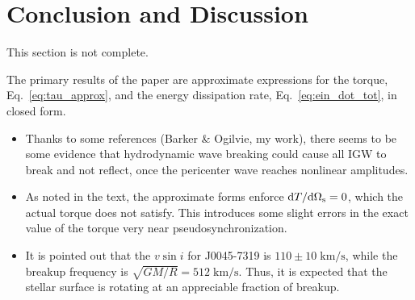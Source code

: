 \documentclass[
        fleqn,
        usenatbib,
    ]{mnras}
\newcommand*{\rdil}[2]{\mathrm{d}#1 / \mathrm{d}#2}
\begin{document}




\section{Conclusion and Discussion}\label{s:disc}

\textcolor{Corr}{This section is not complete.}

The primary results of the paper are approximate expressions for the torque,
Eq.~\eqref{eq:tau_approx}, and the energy dissipation rate,
Eq.~\eqref{eq:ein_dot_tot}, in closed form.

\begin{itemize}
    \item Thanks to some references (Barker \& Ogilvie, my work), there seems to
        be some evidence that hydrodynamic wave breaking could cause all IGW to
        break and not reflect, once the pericenter wave reaches nonlinear
        amplitudes.

    \item As noted in the text, the approximate forms enforce
        $\rdil{T}{\Omega_{\rm s}} = 0$, which the actual torque does not satisfy.
        This introduces some slight errors in the exact value of the torque very
        near pseudosynchronization.

    \item It is pointed out that the $v \sin i$ for J0045-7319 is $110 \pm 10
        \;\mathrm{km/s}$, while the breakup frequency is $\sqrt{GM / R} =
        512\;\mathrm{km/s}$. Thus, it is expected that the stellar surface is
        rotating at an appreciable fraction of breakup.
\end{itemize}
\end{document}
